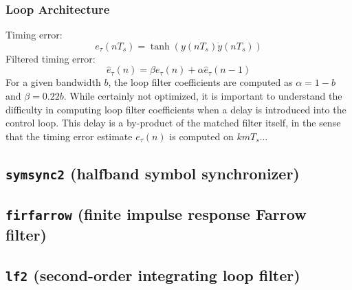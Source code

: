 \subsubsection{Loop Architecture}
Timing error:
\[
    e_\tau(nT_s) = \tanh\left( y(nT_s)\dot{y}(nT_s) \right)
\]
Filtered timing error:
\[
    \hat{e}_\tau(n) = \beta e_\tau(n) + \alpha \hat{e}_\tau(n-1)
\]
For a given bandwidth $b$, the loop filter coefficients are computed as
$\alpha = 1-b$ and $\beta = 0.22b$.
While certainly not optimized, it is important to understand the difficulty in
computing loop filter coefficients when a delay is introduced into the control
loop.
This delay is a by-product of the matched filter itself, in the sense that the
timing error estimate $e_\tau(n)$ is computed on $k m T_s$...

\subsection{{\tt symsync2} (halfband symbol synchronizer)}

\subsection{{\tt firfarrow} (finite impulse response Farrow filter)}

\subsection{{\tt lf2} (second-order integrating loop filter)}


